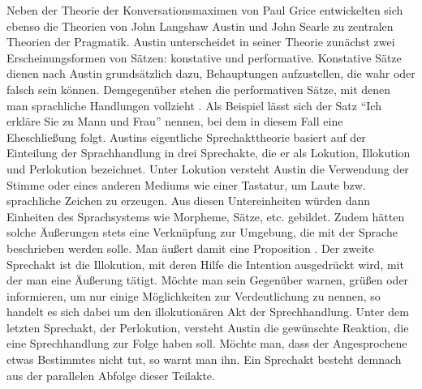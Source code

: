 Neben der Theorie der Konversationsmaximen von Paul Grice entwickelten sich ebenso die Theorien von John Langshaw Austin und John Searle zu zentralen Theorien der Pragmatik.
Austin unterscheidet in seiner Theorie zunächst zwei Erscheinungsformen von Sätzen: konstative und performative.
Konstative Sätze dienen nach Austin grundsätzlich dazu, Behauptungen aufzustellen, die wahr oder falsch sein können.
Demgegenüber stehen die performativen Sätze, mit denen man sprachliche Handlungen vollzieht \cite[S. 207]{AL04}.
Als Beispiel lässt sich der Satz "`Ich erkläre Sie zu Mann und Frau"' nennen, bei dem in diesem Fall eine Eheschließung folgt.
Austins eigentliche Sprechakttheorie basiert auf der Einteilung der Sprachhandlung in drei Sprechakte, die er als Lokution, Illokution und Perlokution bezeichnet.
Unter Lokution versteht Austin die Verwendung der Stimme oder eines anderen Mediums wie einer Tastatur, um Laute bzw. sprachliche Zeichen zu erzeugen.
Aus diesen Untereinheiten würden dann Einheiten des Sprachsystems wie Morpheme, Sätze, etc. gebildet.
Zudem hätten solche Äußerungen stets eine Verknüpfung zur Umgebung, die mit der Sprache beschrieben werden solle.
Man äußert damit eine Proposition \cite[S. 210]{AL04}.
Der zweite Sprechakt ist die Illokution, mit deren Hilfe die Intention ausgedrückt wird, mit der man eine Äußerung tätigt.
Möchte man sein Gegenüber warnen, grüßen oder informieren, um nur einige Möglichkeiten zur Verdeutlichung zu nennen, so handelt es sich dabei um den illokutionären Akt der Sprechhandlung.
Unter dem letzten Sprechakt, der Perlokution, versteht Austin die gewünschte Reaktion, die eine Sprechhandlung zur Folge haben soll.
Möchte man, dass der Angesprochene etwas Bestimmtes nicht tut, so warnt man ihn.
Ein Sprechakt besteht demnach aus der parallelen Abfolge dieser Teilakte.

